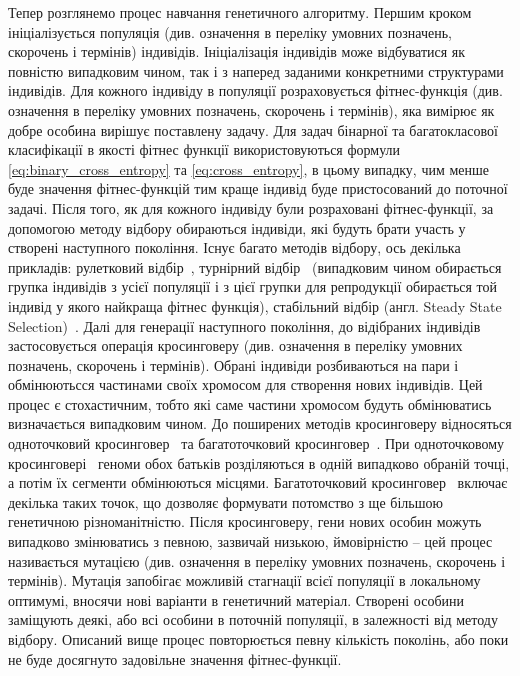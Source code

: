 Тепер розглянемо процес навчання генетичного алгоритму. Першим кроком ініціалізується популяція (див. означення в переліку умовних позначень, скорочень і термінів) індивідів. Ініціалізація індивідів може відбуватися як повністю випадковим чином, так і з наперед заданими конкретними структурами індивідів. Для кожного індивіду в популяції розраховується фітнес-функція (див. означення в переліку умовних позначень, скорочень і термінів), яка вимірює як добре особина вирішує поставлену задачу. Для задач бінарної та багатокласової класифікації в якості фітнес функції використовуються формули \ref{eq:binary_cross_entropy} та \ref{eq:cross_entropy}, в цьому випадку, чим менше буде значення фітнес-функцій тим краще індивід буде пристосований до поточної задачі. Після того, як для кожного індивіду були розраховані фітнес-функції, за допомогою методу відбору обираються індивіди, які будуть брати участь у створені наступного покоління. Існує багато методів відбору, ось декілька прикладів: рулетковий відбір~\cite{ct2}, турнірний відбір~\cite{ct3} (випадковим чином обирається групка індивідів з усієї популяції і з цієї групки для репродукції обирається той індивід у якого найкраща фітнес функція), стабільний відбір (англ. Steady State Selection)~\cite{ct5}. Далі для генерації наступного покоління, до відібраних індивідів застосовується операція кросинговеру (див. означення в переліку умовних позначень, скорочень і термінів). Обрані індивіди розбиваються на пари і обмінюютьсся частинами своїх хромосом для створення нових індивідів. Цей процес є стохастичним, тобто які саме частини хромосом будуть обмінюватись визначається випадковим чином. До поширених методів кросинговеру відносяться одноточковий кросинговер~\cite{ct10} та багатоточковий кросинговер~\cite{ct11}. При одноточковому кросинговері~\cite{ct10} геноми обох батьків розділяються в одній випадково обраній точці, а потім їх сегменти обмінюються місцями. Багатоточковий кросинговер~\cite{ct11} включає декілька таких точок, що дозволяє формувати потомство з ще більшою генетичною різноманітністю. Після кросинговеру, гени нових особин можуть випадково змінюватись з певною, зазвичай низькою, ймовірністю -- цей процес називається мутацією (див. означення в переліку умовних позначень, скорочень і термінів). Мутація запобігає можливій стагнації всієї популяції в локальному оптимумі, вносячи нові варіанти в генетичний матеріал. Створені особини заміщують деякі, або всі особини в поточній популяції, в залежності від методу відбору. Описаний вище процес повторюється певну кількість поколінь, або поки не буде досягнуто задовільне значення фітнес-функції.

